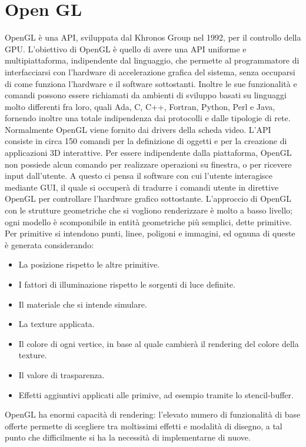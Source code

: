 \section{Open GL}
\label{sec:chapter_stato_arte_open_gl}

OpenGL è una API, sviluppata dal Khronos Group nel 1992, per il controllo della GPU. L’obiettivo di OpenGL è quello di avere una API uniforme e multipiattaforma, indipendente dal linguaggio, che permette al programmatore di interfacciarsi con l’hardware di accelerazione grafica del sistema, senza occuparsi di come funziona l’hardware e il software sottostanti. 
Inoltre le sue funzionalità e comandi possono essere richiamati da ambienti di sviluppo basati su linguaggi molto differenti fra loro, quali Ada, C, C++, Fortran, Python, Perl e Java, fornendo inoltre una totale indipendenza dai protocolli e dalle tipologie di rete. 
Normalmente OpenGL viene fornito dai drivers della scheda video. 
L’API consiste in circa 150 comandi per la definizione di oggetti e per la creazione di applicazioni 3D interattive. Per essere indipendente dalla piattaforma, OpenGL non possiede alcun comando per realizzare operazioni su finestra, o per ricevere input dall’utente. 
A questo ci pensa il software con cui l’utente interagisce mediante GUI, il quale si occuperà di tradurre i comandi utente in direttive OpenGL per controllare l’hardware grafico sottostante. 
L’approccio di OpenGL con le strutture geometriche che si vogliono renderizzare è molto a basso livello; ogni modello è scomponibile in entità geometriche più semplici, dette primitive. Per primitive si intendono punti, linee, poligoni e immagini, ed ognuna di queste è generata considerando:
\begin{itemize}
\item La posizione rispetto le altre primitive.
\item I fattori di illuminazione rispetto le sorgenti di luce definite.
\item Il materiale che si intende simulare.
\item La texture applicata.
\item Il colore di ogni vertice, in base al quale cambierà il rendering del colore della texture.
\item Il valore di trasparenza.
\item Effetti aggiuntivi applicati alle primive, ad esempio tramite lo stencil-buffer. 
\end{itemize}
OpenGL ha enormi capacità di rendering: l’elevato numero di funzionalità di base offerte permette di scegliere tra moltissimi effetti e modalità di disegno, a tal punto che difficilmente si ha la necessità di implementarne di nuove.

